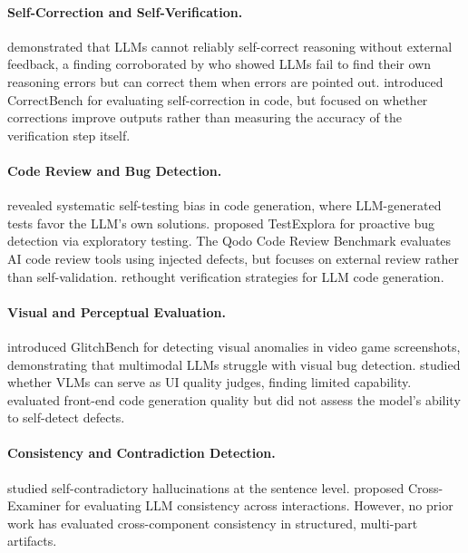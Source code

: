\documentclass[11pt]{fairmeta}
\begin{document}
\paragraph{Self-Correction and Self-Verification.}
\citet{huang2024selfverification} demonstrated that LLMs cannot reliably self-correct reasoning without external feedback, a finding corroborated by \citet{tyen2024selfverification} who showed LLMs fail to find their own reasoning errors but can correct them when errors are pointed out. \citet{correctbench2024} introduced CorrectBench for evaluating self-correction in code, but focused on whether corrections improve outputs rather than measuring the accuracy of the verification step itself.

\paragraph{Code Review and Bug Detection.}
\citet{kamoi2024selftesting} revealed systematic self-testing bias in code generation, where LLM-generated tests favor the LLM's own solutions. \citet{testexplora2026} proposed TestExplora for proactive bug detection via exploratory testing. The Qodo Code Review Benchmark \citep{qodobenchmark2026} evaluates AI code review tools using injected defects, but focuses on external review rather than self-validation. \citet{saga2025} rethought verification strategies for LLM code generation.

\paragraph{Visual and Perceptual Evaluation.}
\citet{glitchbench2024} introduced GlitchBench for detecting visual anomalies in video game screenshots, demonstrating that multimodal LLMs struggle with visual bug detection. \citet{webqualitybench2025} studied whether VLMs can serve as UI quality judges, finding limited capability. \citet{design2code2025} evaluated front-end code generation quality but did not assess the model's ability to self-detect defects.

\paragraph{Consistency and Contradiction Detection.}
\citet{selfcontradictory2023} studied self-contradictory hallucinations at the sentence level. \citet{crossexaminer2025} proposed Cross-Examiner for evaluating LLM consistency across interactions. However, no prior work has evaluated cross-component consistency in structured, multi-part artifacts.
\end{document}
